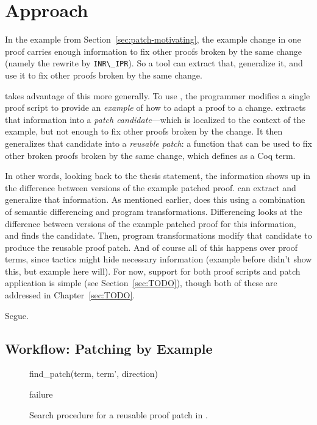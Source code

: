 \section{Approach}

In the example from Section~\ref{sec:patch-motivating}, the example change in one proof carries enough information
to fix other proofs broken by the same change (namely the rewrite by \lstinline{INR\_IPR}).
So a tool can extract that, generalize it, and use it to fix other proofs broken by the same change.

\sysname takes advantage of this more generally.
To use \sysname, the programmer modifies a single proof script to provide an \textit{example} of how to adapt a proof to a change.
\sysname extracts that information into a \textit{patch candidate}---which is localized to the context of the example, but not enough to fix other proofs broken by the change.
It then generalizes that candidate into a \textit{reusable patch}: a function
that can be used to fix other broken proofs broken by the same change, which \sysname defines as a Coq term.

In other words, looking back to the thesis statement, the information shows up in the difference between versions of the example patched proof.
\sysname can extract and generalize that information.
As mentioned earlier, \sysname does this using a combination of semantic differencing and program transformations.
Differencing looks at the difference between versions of the example patched proof for this information, and finds the candidate.
Then, program transformations modify that candidate to produce the reusable proof patch.
And of course all of this happens over proof terms, since tactics might hide necessary information
(example before didn't show this, but example here will).
For now, support for both proof scripts and patch application is simple (see Section~\ref{sec:TODO}), though both of these are addressed in Chapter~\ref{sec:TODO}.

Segue.

\subsection{Workflow: Patching by Example}

\begin{figure}
\begin{algorithmic}
\renewcommand{\thealgorithm}{}
\footnotesize
\caption{\footnotesize{find\_patch(term, term', direction)}}
    \STATE {}
    \STATE {}
      \STATE {}
    \ENDIF
    \RETURN failure
\end{algorithmic}
\caption{Search procedure for a reusable proof patch in \sysname.}
\label{alg:patching}	
\end{figure}

